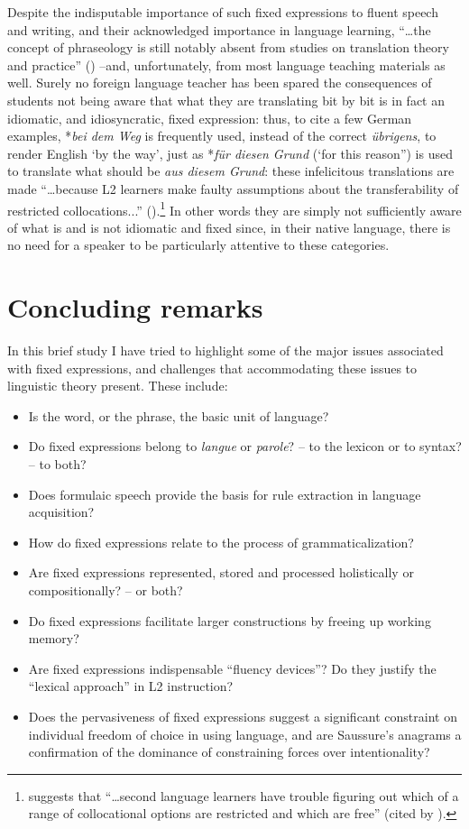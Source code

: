 \documentclass[output=paper]{langsci/langscibook}
\begin{document}
Despite the indisputable importance of such fixed expressions to fluent speech and writing, and their acknowledged importance in language learning, “…the concept of phraseology is still notably absent from studies on translation theory and practice” (\citealt[xxiv]{granger_phraseology:_2008}) –and, unfortunately, from most language teaching materials as well. Surely no foreign language teacher has been spared the consequences of students not being aware that what they are translating bit by bit is in fact an idiomatic, and idiosyncratic, fixed expression: thus, to cite a few German examples, *\textit{bei dem  Weg} is frequently used, instead of the correct \textit{übrigens}, to render English `by the way', just as *\textit{für diesen Grund} (‘for this reason'') is used to translate what should be \textit{aus diesem Grund}: these infelicitous translations are made “…because L2 learners make faulty assumptions about the transferability of restricted collocations...” (\citealt[833]{kim_frequency_2012}).\footnote{\citet[34]{howarth_phraseology_1998} suggests that “…second language learners have trouble figuring out which of a range of collocational options are restricted and which are free” (cited by \citealt[833]{kim_frequency_2012}).} In other words they are simply not sufficiently aware of what is and is not idiomatic and fixed since, in their native language, there is no need for a speaker to be particularly attentive to these categories.

\section{Concluding remarks}
In this brief study I have tried to highlight some of the major issues associated with fixed expressions, and challenges that accommodating these issues to linguistic theory present. These include:

\begin{itemize}
\item Is the word, or the phrase, the basic unit of language?
\item Do fixed expressions belong to \textit{langue} or \textit{parole}? – to the lexicon or to syntax? – to both? 
\item Does formulaic speech provide the basis for rule extraction in language acquisition?
\item How do fixed expressions relate to the process of grammaticalization?
\item Are fixed expressions represented, stored and processed holistically or compositionally? – or both?
\item Do fixed expressions facilitate larger constructions by freeing up working memory?
\item Are fixed expressions indispensable ``fluency devices''? Do they justify the ``lexical approach'' in L2 instruction?
\item Does the pervasiveness of fixed expressions suggest a significant constraint on individual freedom of choice in using language, and are Saussure’s anagrams a confirmation of the dominance of constraining forces over intentionality?
\end{itemize}
\end{document}
